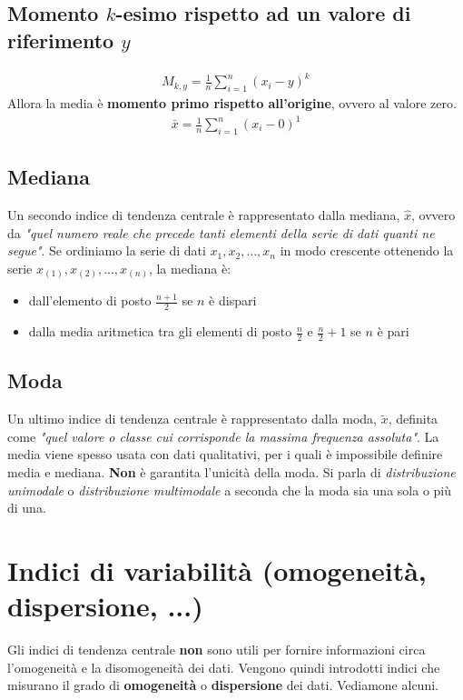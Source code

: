 \subsection{Momento $k$-esimo rispetto ad un valore di riferimento $y$}
\begin{align}
M_{k,y} = \frac{1}{n} \sum_{i = 1}^{n} (x_i - y)^k
\end{align}
Allora la media è \textbf{momento primo rispetto all'origine}, ovvero al valore zero.
\begin{align}
\bar{x} = \frac{1}{n} \sum_{i = 1}^{n} (x_i - 0)^1
\end{align}

\subsection{Mediana}
Un secondo indice di tendenza centrale è rappresentato dalla mediana, $\hat{x}$, ovvero da \textit{"quel numero reale che precede tanti elementi della serie di dati quanti ne segue"}.
Se ordiniamo la serie di dati $x_1, x_2, ..., x_n$ in modo crescente ottenendo la serie $x_{(1)}, x_{(2)}, ..., x_{(n)}$, la mediana è:
\begin{itemize}
	\item dall'elemento di posto $ \frac{n+1}{2} $ se $n$ è dispari
	\item dalla media aritmetica tra gli elementi di posto $\frac{n}{2}$ e $ \frac{n}{2} + 1$ se $n$ è pari
\end{itemize}

\subsection{Moda}
Un ultimo indice di tendenza centrale è rappresentato dalla moda, $\tilde{x}$, definita come \textit{"quel valore o classe cui corrisponde la massima frequenza assoluta"}. La media viene spesso usata con dati qualitativi, per i quali è impossibile definire media e mediana. \newline
\textbf{Non} è garantita l'unicità della moda. Si parla di \textit{distribuzione unimodale} o \textit{distribuzione multimodale} a seconda che la moda sia una sola o più di una.

\section{Indici di variabilità (omogeneità, dispersione, ...)}
Gli indici di tendenza centrale \textbf{non} sono utili per fornire informazioni circa l'omogeneità e la disomogeneità dei dati. Vengono quindi introdotti indici che misurano il grado di \textbf{omogeneità} o \textbf{dispersione} dei dati. Vediamone alcuni.

